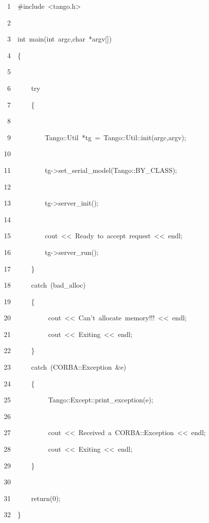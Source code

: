 
\begin{lyxcode}
~~~~~1~~\#include~<tango.h>

~~~~~2~~

~~~~~3~~int~main(int~argc,char~{*}argv{[}{]})

~~~~~4~~\{

~~~~~5~~

~~~~~6~~~~~~try

~~~~~7~~~~~~\{

~~~~~8~~~~~~~~~~

~~~~~9~~~~~~~~~~Tango::Util~{*}tg~=~Tango::Util::init(argc,argv);

~~~~10~~

~~~~11~~~~~~~~~~tg->set\_serial\_model(Tango::BY\_CLASS);

~~~~12~~

~~~~13~~~~~~~~~~tg->server\_init();

~~~~14~~

~~~~15~~~~~~~~~~cout~<\textcompwordmark{}<~\textquotedbl{}Ready~to~accept~request\textquotedbl{}~<\textcompwordmark{}<~endl;

~~~~16~~~~~~~~~~tg->server\_run();

~~~~17~~~~~~\}

~~~~18~~~~~~catch~(bad\_alloc)

~~~~19~~~~~~\{

~~~~20~~~~~~~~~~~cout~<\textcompwordmark{}<~\textquotedbl{}Can't~allocate~memory!!!\textquotedbl{}~<\textcompwordmark{}<~endl;

~~~~21~~~~~~~~~~~cout~<\textcompwordmark{}<~\textquotedbl{}Exiting\textquotedbl{}~<\textcompwordmark{}<~endl;

~~~~22~~~~~~\}

~~~~23~~~~~~catch~(CORBA::Exception~\&e)

~~~~24~~~~~~\{

~~~~25~~~~~~~~~~~Tango::Except::print\_exception(e);

~~~~26~~~~~~~~~~~~~~~~~~

~~~~27~~~~~~~~~~~cout~<\textcompwordmark{}<~\textquotedbl{}Received~a~CORBA::Exception\textquotedbl{}~<\textcompwordmark{}<~endl;

~~~~28~~~~~~~~~~~cout~<\textcompwordmark{}<~\textquotedbl{}Exiting\textquotedbl{}~<\textcompwordmark{}<~endl;

~~~~29~~~~~~\}

~~~~30~~~~~~~~~~

~~~~31~~~~~~return(0);

~~~~32~~\}


\end{lyxcode}


